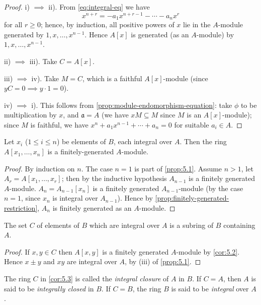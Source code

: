 \begin{proof}
    i) $\implies$ ii). From \eqref{eq:integral-eq} we have
    \[
    x^{n+r} = -a_1 x^{n+r-1} - \cdots - a_n x^r
    \]
    for all $r \geq 0$; hence, by induction, all positive powers of $x$ lie in the $A$-module generated by $1, x, \ldots, x^{n-1}$. Hence $A[x]$ is generated (as an $A$-module) by $1, x, \ldots, x^{n-1}$.

    ii) $\implies$ iii). Take $C = A[x]$.

    iii) $\implies$ iv). Take $M = C$, which is a faithful $A[x]$-module (since $yC = 0 \implies y \cdot 1 = 0$).

    iv) $\implies$ i). This follows from \eqref{prop:module-endomorphism-equation}: take $\phi$ to be multiplication by $x$, and $\mathfrak{a} = A$ (we have $xM \subseteq M$ since $M$ is an $A[x]$-module); since $M$ is faithful, we have $x^n + a_1 x^{n-1} + \cdots + a_n = 0$ for suitable $a_i \in A$.
\end{proof}

\begin{corollary}\label{cor:5.2}
    Let $x_i$ ($1 \leq i \leq n$) be elements of $B$, each integral over $A$. Then the ring $A[x_1, \ldots, x_n]$ is a finitely-generated $A$-module.
\end{corollary}

\begin{proof}
    By induction on $n$. The case $n = 1$ is part of \eqref{prop:5.1}. Assume $n > 1$, let $A_r = A[x_1, \ldots, x_r]$; then by the inductive hypothesis $A_{n-1}$ is a finitely generated $A$-module. $A_n = A_{n-1}[x_n]$ is a finitely generated $A_{n-1}$-module (by the case $n = 1$, since $x_n$ is integral over $A_{n-1}$). Hence by \eqref{prop:finitely-generated-restriction}, $A_n$ is finitely generated as an $A$-module.
\end{proof}

\begin{corollary}\label{cor:5.3}
    The set $C$ of elements of $B$ which are integral over $A$ is a subring of $B$ containing $A$.
\end{corollary}

\begin{proof}
    If $x, y \in C$ then $A[x, y]$ is a finitely generated $A$-module by \eqref{cor:5.2}. Hence $x \pm y$ and $xy$ are integral over $A$, by (iii) of \eqref{prop:5.1}.
\end{proof}

The ring $C$ in \eqref{cor:5.3} is called the \emph{integral closure} of $A$ in $B$. If $C = A$, then $A$ is said to be \emph{integrally closed} in $B$. If $C = B$, the ring $B$ is said to be \emph{integral} over $A$.

